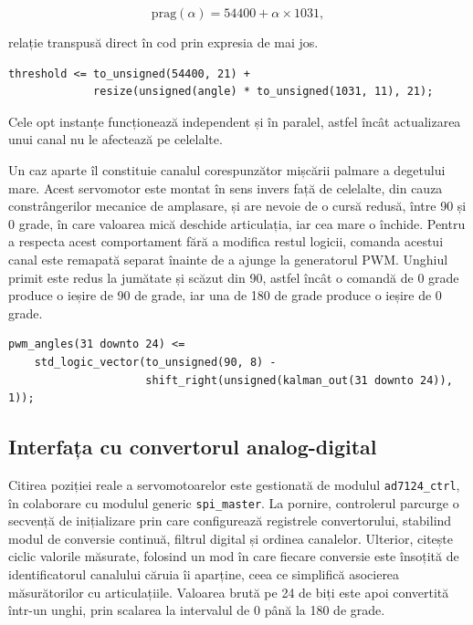 \begin{equation*}
\text{prag}(\alpha) = 54400 + \alpha \times 1031,
\end{equation*}

relație transpusă direct în cod prin expresia de mai jos.

\begin{lstlisting}[caption={Calculul pragului de comparație din unghi.},label={lst:pwm-thr}]
threshold <= to_unsigned(54400, 21) +
             resize(unsigned(angle) * to_unsigned(1031, 11), 21);
\end{lstlisting}

Cele opt instanțe funcționează independent și în paralel, astfel încât actualizarea
unui canal nu le afectează pe celelalte.

Un caz aparte îl constituie canalul corespunzător mișcării palmare a degetului mare.
Acest servomotor este montat în sens invers față de celelalte, din cauza
constrângerilor mecanice de amplasare, și are nevoie de o cursă redusă, între 90 și 0
grade, în care valoarea mică deschide articulația, iar cea mare o închide. Pentru a
respecta acest comportament fără a modifica restul logicii, comanda acestui canal este
remapată separat înainte de a ajunge la generatorul PWM. Unghiul primit este redus la
jumătate și scăzut din 90, astfel încât o comandă de 0 grade produce o ieșire de 90 de
grade, iar una de 180 de grade produce o ieșire de 0 grade.

\begin{lstlisting}[caption={Remaparea canalului degetului mare, inversat și scalat.},label={lst:remap}]
pwm_angles(31 downto 24) <=
    std_logic_vector(to_unsigned(90, 8) -
                     shift_right(unsigned(kalman_out(31 downto 24)), 1));
\end{lstlisting}

\subsection{Interfața cu convertorul analog-digital}

Citirea poziției reale a servomotoarelor este gestionată de modulul
\texttt{ad7124\_ctrl}, în colaborare cu modulul generic \texttt{spi\_master}. La
pornire, controlerul parcurge o secvență de inițializare prin care configurează
registrele convertorului, stabilind modul de conversie continuă, filtrul digital și
ordinea canalelor. Ulterior, citește ciclic valorile măsurate, folosind un mod în
care fiecare conversie este însoțită de identificatorul canalului căruia îi aparține,
ceea ce simplifică asocierea măsurătorilor cu articulațiile. Valoarea brută pe 24 de
biți este apoi convertită într-un unghi, prin scalarea la intervalul de 0 până la 180
de grade.

